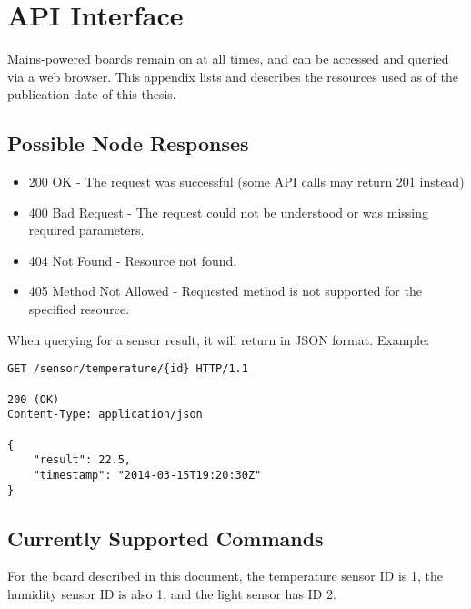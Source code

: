 \chapter{API Interface}

Mains-powered boards remain on at all times, and can be accessed and queried via a web browser. This appendix lists and describes the resources used as of the publication date of this thesis.

\section{Possible Node Responses}
\begin{itemize}
\item 200 OK - The request was successful (some API calls may return 201 instead)
\item 400 Bad Request - The request could not be understood or was missing required parameters.
\item 404 Not Found - Resource not found.
\item 405 Method Not Allowed - Requested method is not supported for the specified resource.
\end{itemize}

When querying for a sensor result, it will return in JSON format. Example:

\begin{lstlisting}
GET /sensor/temperature/{id} HTTP/1.1

200 (OK)
Content-Type: application/json

{
	"result": 22.5,
	"timestamp": "2014-03-15T19:20:30Z"
}
\end{lstlisting}

\section{Currently Supported Commands}

For the board described in this document, the temperature sensor ID is 1, the humidity sensor ID is also 1, and the light sensor has ID 2.

